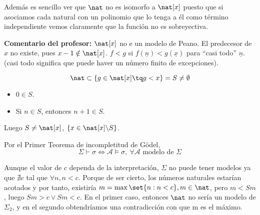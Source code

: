 \begin{problem}
Además es sencillo ver que $\nat$ no es isomorfo a $\nat[x]$ puesto que si asociamos cada natural con un polinomio que lo tenga a él como término independiente vemos claramente que la función no es sobreyectiva.

\textbf{Comentario del profesor:}
$\nat[x]$ no e un modelo de Peano. El predecesor de $x$ no existe, pues $x-1\notin\nat[x]$. 
$f<g$ si $f(\underline{n})<g(\underline{x})$ para ``casi todo'' $\underline{n}$. (casi todo significa que puede haver un número finito de excepciones).
\begin{obs}
	$$\nat \subset \{g\in \nat[x]\tq g < x\} = S \neq \emptyset$$
	\begin{itemize}
		\item $0\in S$.
		\item Si $n\in S$, entonces $n+1\in S$.
	\end{itemize}
	Luego $S\neq \nat[x]$, $\{x\in \nat[x]\backslash S\}$.
\end{obs}

\spart

Por el Primer Teorema de incompletitud de Gödel,
\[ \Sigma \vdash \sigma \iff \mathcal{A} \models \sigma, \ \forall \mathcal{A} \text{ modelo de } \Sigma\]

Aunque el valor de $c$ dependa de la interpretación, $\Sigma$ no puede tener modelos ya que $\nexists c $ tal que $\forall n, n < c$. Porque de ser cierto, los números naturales estarían acotados y por tanto, existiría $m = \max\set{ n : n < c}, m \in \nat$, pero $m < Sm$, luego $Sm > c \lor Sm < c$. En el primer caso, entonces $\nat$ no sería un modelo de $\Sigma_2$, y en el segundo obtendríamos una contradicción con que m es el máximo.

\end{problem}
